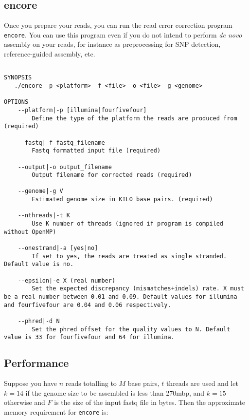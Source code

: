 \documentclass[12pt,a4paper]{report}
\begin{document}
\subsection{encore}

Once you prepare your reads, you can run the read error correction program \texttt{encore}. You can use this program even if you do not intend to perform \emph{de novo} assembly on your reads, for instance as preprocessing for SNP detection, reference-guided assembly, etc.

\begin{lstlisting}

SYNOPSIS
   ./encore -p <platform> -f <file> -o <file> -g <genome> 

OPTIONS 
    --platform|-p [illumina|fourfivefour] 
        Define the type of the platform the reads are produced from (required) 

    --fastq|-f fastq_filename 
        Fastq formatted input file (required) 

    --output|-o output_filename 
        Output filename for corrected reads (required) 

    --genome|-g V 
        Estimated genome size in KILO base pairs. (required) 

    --nthreads|-t K 
        Use K number of threads (ignored if program is compiled without OpenMP) 

    --onestrand|-a [yes|no] 
        If set to yes, the reads are treated as single stranded. Default value is no. 

    --epsilon|-e X (real number) 
        Set the expected discrepancy (mismatches+indels) rate. X must be a real number between 0.01 and 0.09. Default values for illumina and fourfivefour are 0.04 and 0.06 respectively. 

    --phred|-d N 
        Set the phred offset for the quality values to N. Default value is 33 for fourfivefour and 64 for illumina. 

\end{lstlisting}

\subsection{Performance}

Suppose you have $n$ reads totalling to $M$ base pairs, $t$ threads are used and let $k=14$ if the genome size to be assembled is less than 270mbp, and $k=15$ otherwise and $F$ is the size of the input fastq file in bytes. Then the approximate memory requirement for \texttt{encore} is:
\end{document}
